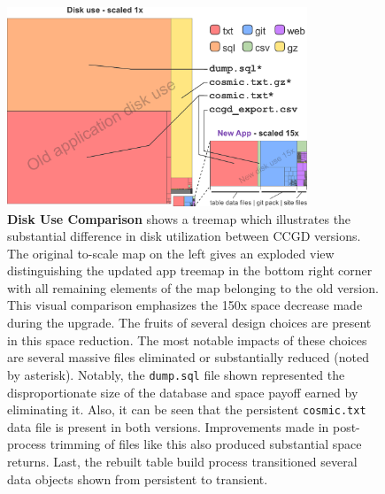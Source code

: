 \documentclass[10pt]{report}
\begin{document}
\begin{figure}[H]
    \center{}
    \includegraphics[width=0.8\textwidth]{fig/space_tree.pdf}
    \caption[Disk Use Comparison]{\textbf{Disk Use Comparison} shows a treemap which illustrates the substantial difference in disk utilization between CCGD versions. The original to-scale map on the left gives an exploded view distinguishing the updated app treemap in the bottom right corner with all remaining elements of the map belonging to the old version. This visual comparison emphasizes the 150x space decrease made during the upgrade. The fruits of several design choices are present in this space reduction. The most notable impacts of these choices are several massive files eliminated or substantially reduced (noted by asterisk). Notably, the \texttt{dump.sql} file shown represented the disproportionate size of the database and space payoff earned by eliminating it. Also, it can be seen that the persistent \texttt{cosmic.txt} data file is present in both versions. Improvements made in post-process trimming of files like this also produced substantial space returns. Last, the rebuilt table build process transitioned several data objects shown from persistent to transient.}\label{fig:spaceTree}
\end{figure}
\end{document}
